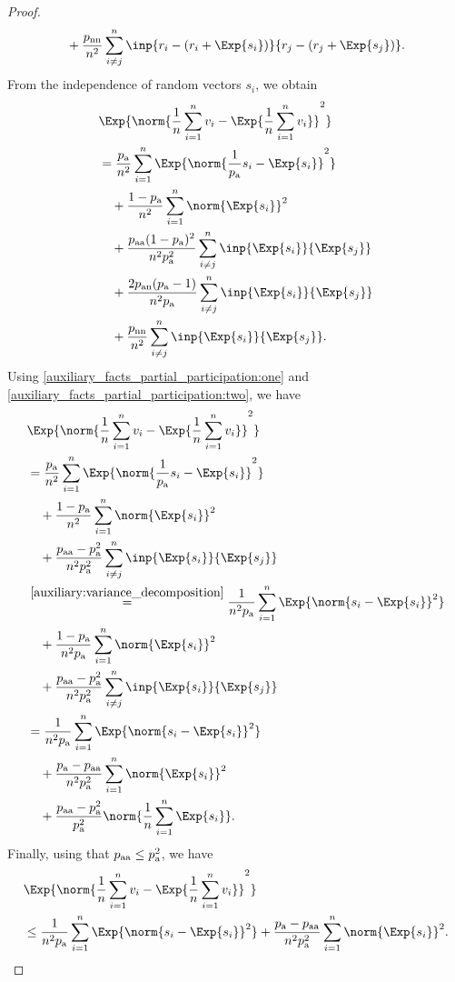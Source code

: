 \documentclass{article}
\newcommand*{\probavailable}{\ensuremath{p_{\textnormal{a}}}}
\newcommand*{\probpairaa}{\ensuremath{p_{\textnormal{aa}}}}
\newcommand*{\probpairan}{\ensuremath{p_{\textnormal{an}}}}
\newcommand*{\probpairnn}{\ensuremath{p_{\textnormal{nn}}}}
\begin{document}
\begin{proof}
\begin{align*}
    &\quad +\frac{\probpairnn}{n^2}\sum_{i\neq j}^n\inp{r_i - \left(r_i + \Exp{s_i}\right)}{r_j - \left(r_j + \Exp{s_j}\right)}.
  \end{align*}
  From the independence of random vectors $s_i$, we obtain
  \begin{align*}
    &\Exp{\norm{\frac{1}{n}\sum_{i=1}^n v_i - \Exp{\frac{1}{n}\sum_{i=1}^n v_i}}^2} \\
    &=\frac{\probavailable}{n^2}\sum_{i=1}^n\Exp{\norm{\frac{1}{\probavailable} s_i - \Exp{s_i}}^2} \\
    &\quad +\frac{1 - \probavailable}{n^2}\sum_{i=1}^n\norm{\Exp{s_i}}^2 \\
    &\quad +\frac{\probpairaa (1 - \probavailable)^2}{n^2 \probavailable^2}\sum_{i\neq j}^n\inp{\Exp{s_i}}{\Exp{s_j}} \\
    &\quad +\frac{2 \probpairan (\probavailable - 1)}{n^2 \probavailable}\sum_{i\neq j}^n\inp{\Exp{s_i}}{\Exp{s_j}} \\
    &\quad +\frac{\probpairnn}{n^2}\sum_{i\neq j}^n\inp{\Exp{s_i}}{\Exp{s_j}}.
  \end{align*}
  Using \eqref{auxiliary_facts_partial_participation:one} and \eqref{auxiliary_facts_partial_participation:two}, we have
  \begin{align*}
    &\Exp{\norm{\frac{1}{n}\sum_{i=1}^n v_i - \Exp{\frac{1}{n}\sum_{i=1}^n v_i}}^2} \\
    &=\frac{\probavailable}{n^2}\sum_{i=1}^n\Exp{\norm{\frac{1}{\probavailable} s_i - \Exp{s_i}}^2} \\
    &\quad +\frac{1 - \probavailable}{n^2}\sum_{i=1}^n\norm{\Exp{s_i}}^2 \\
    &\quad +\frac{\probpairaa - \probavailable^2}{n^2 \probavailable^2}\sum_{i\neq j}^n\inp{\Exp{s_i}}{\Exp{s_j}} \\
    &\overset{\eqref{auxiliary:variance_decomposition}}{=}\frac{1}{n^2 \probavailable}\sum_{i=1}^n\Exp{\norm{s_i - \Exp{s_i}}^2} \\
    &\quad +\frac{1 - \probavailable}{n^2 \probavailable}\sum_{i=1}^n\norm{\Exp{s_i}}^2 \\
    &\quad +\frac{\probpairaa - \probavailable^2}{n^2 \probavailable^2}\sum_{i\neq j}^n\inp{\Exp{s_i}}{\Exp{s_j}} \\
    &=\frac{1}{n^2 \probavailable}\sum_{i=1}^n\Exp{\norm{s_i - \Exp{s_i}}^2} \\
    &\quad +\frac{\probavailable - \probpairaa}{n^2 \probavailable^2}\sum_{i=1}^n\norm{\Exp{s_i}}^2 \\
    &\quad +\frac{\probpairaa - \probavailable^2}{\probavailable^2}\norm{\frac{1}{n}\sum_{i=1}^n\Exp{s_i}}.
  \end{align*}
  Finally, using that $\probpairaa \leq \probavailable^2$, we have
  \begin{align*}
    &\Exp{\norm{\frac{1}{n}\sum_{i=1}^n v_i - \Exp{\frac{1}{n}\sum_{i=1}^n v_i}}^2} \\
    &\leq\frac{1}{n^2 \probavailable}\sum_{i=1}^n\Exp{\norm{s_i - \Exp{s_i}}^2} +\frac{\probavailable - \probpairaa}{n^2 \probavailable^2}\sum_{i=1}^n\norm{\Exp{s_i}}^2.
  \end{align*}
\end{proof}
\end{document}
